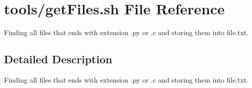 \hypertarget{getFiles_8sh}{}\section{tools/get\+Files.sh File Reference}
\label{getFiles_8sh}


Finding all files that ends with extension .py or .c and storing them into file.\+txt.  




\subsection{Detailed Description}
Finding all files that ends with extension .py or .c and storing them into file.\+txt. 

